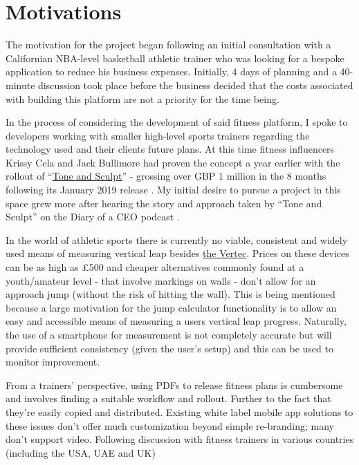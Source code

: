\section{Motivations}
\label{sec:intro_motivation}
The motivation for the project began following an initial consultation with a Californian
NBA-level basketball athletic trainer who was looking for a bespoke application
to reduce his business expenses. Initially, 4 days of planning and a 40-minute discussion
took place before the business decided that the costs associated with building this platform
are not a priority for the time being.
\par
In the process of considering the development of said fitness platform, I spoke to developers
working with smaller high-level sports trainers regarding the technology used and their clients
future plans. At this time fitness influencers Krissy Cela and Jack Bullimore had proven the concept
a year earlier with the rollout of ``\href{https://toneandsculpt.app/}{Tone and Sculpt}'' -
grossing over GBP 1 million in the 8 months following its January 2019 release \cite{tonensculpt}.
My initial desire to pursue a project in this space grew more after hearing the story and approach taken by
``Tone and Sculpt'' on the Diary of a CEO podcast \cite{krissy-podcast}.
\par
In the world of athletic sports there is currently no viable, consistent and widely used means
of measuring vertical leap besides
\href{https://www.topendsports.com/testing/products/vertical-jump/vertec.htm}{the Vertec}.
Prices on these devices can be as high as £500 and cheaper alternatives commonly found
at a youth/amateur level - that involve markings on walls - don't allow for an approach
jump (without the risk of hitting the wall). This is being mentioned because a large motivation for the jump calculator
functionality is to allow an easy and accessible means of measuring a users vertical leap
progress. Naturally, the use of a smartphone for measurement is not completely accurate but
will provide sufficient consistency (given the user's setup) and this can be used to monitor
improvement.
\par
From a trainers' perspective,  using PDFs to release fitness plans is cumbersome
and involves finding a suitable workflow and rollout. Further to the fact that they're
easily copied and distributed. Existing white label mobile app solutions to these issues
don't offer much customization beyond simple re-branding; many don't support video.
Following discussion with fitness trainers in various countries (including the USA, UAE and UK)
